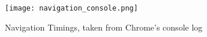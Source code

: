 


\begin{figure}[h!]
\begin{center}
\texttt{[image: navigation\_console.png]}
\caption{Navigation Timings, taken from Chrome's console log}
\label{figure:navigation_console}
\end{center}
\end{figure}






